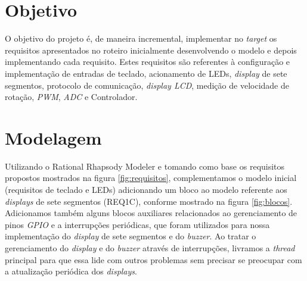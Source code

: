 \documentclass{article}
\begin{document}


\onehalfspacing
\section{Objetivo} 
O objetivo do projeto é, de maneira incremental, implementar no \textit{target} os requisitos apresentados no roteiro\cite{bb:roteiro} inicialmente desenvolvendo o modelo e depois implementando cada requisito. Estes requisitos são referentes à configuração e implementação de entradas de teclado, acionamento de LEDs, \textit{display} de sete segmentos, protocolo de comunicação, \textit{display LCD}, medição de velocidade de rotação, \textit{PWM}, \textit{ADC} e Controlador. 
	
\section{Modelagem}
Utilizando o Rational Rhapsody Modeler e tomando como base os requisitos propostos mostrados na figura \ref{fig:requisitos}, complementamos o modelo inicial\cite{bb:modelo} (requisitos de teclado e LEDs) adicionando um bloco ao modelo referente aos \textit{displays} de sete segmentos (REQ1C), conforme mostrado na figura \ref{fig:blocos}. Adicionamos também alguns blocos auxiliares relacionados ao gerenciamento de pinos \textit{GPIO} e a interrupções periódicas, que foram utilizados para nossa implementação do \textit{display} de sete segmentos e do \textit{buzzer}. Ao tratar o gerenciamento do \textit{display} e do \textit{buzzer} através de interrupções, livramos a \textit{thread} principal para que essa lide com outros problemas sem precisar se preocupar com a atualização periódica dos \textit{displays}.
\end{document}
